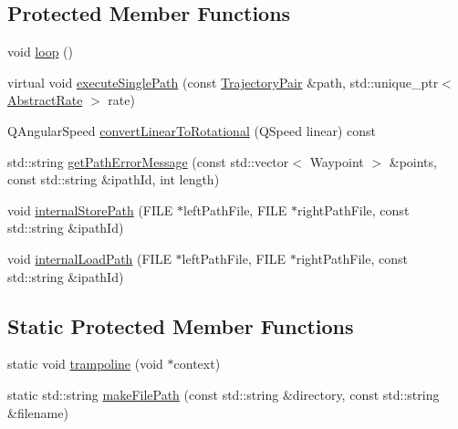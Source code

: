 \subsection*{Protected Member Functions}
\begin{DoxyCompactItemize}
\item 
void \mbox{\hyperlink{classokapi_1_1AsyncMotionProfileController_a8a41524c4cc3352e2eda15dfe3e7ad27}{loop}} ()
\item 
virtual void \mbox{\hyperlink{classokapi_1_1AsyncMotionProfileController_abbc724e5856bff8879cb834bfc3cc6c3}{execute\+Single\+Path}} (const \mbox{\hyperlink{structokapi_1_1AsyncMotionProfileController_1_1TrajectoryPair}{Trajectory\+Pair}} \&path, std\+::unique\+\_\+ptr$<$ \mbox{\hyperlink{classokapi_1_1AbstractRate}{Abstract\+Rate}} $>$ rate)
\item 
Q\+Angular\+Speed \mbox{\hyperlink{classokapi_1_1AsyncMotionProfileController_a74b2981453d36e01c30b66c522bdcb52}{convert\+Linear\+To\+Rotational}} (Q\+Speed linear) const
\item 
std\+::string \mbox{\hyperlink{classokapi_1_1AsyncMotionProfileController_add71d15d34ef8c10205c3b6791e32f71}{get\+Path\+Error\+Message}} (const std\+::vector$<$ Waypoint $>$ \&points, const std\+::string \&ipath\+Id, int length)
\item 
void \mbox{\hyperlink{classokapi_1_1AsyncMotionProfileController_ae9f67978e53a0bab9c96ef774505bd58}{internal\+Store\+Path}} (F\+I\+LE $\ast$left\+Path\+File, F\+I\+LE $\ast$right\+Path\+File, const std\+::string \&ipath\+Id)
\item 
void \mbox{\hyperlink{classokapi_1_1AsyncMotionProfileController_adc93d9516b749dee19f0af735d4b83cb}{internal\+Load\+Path}} (F\+I\+LE $\ast$left\+Path\+File, F\+I\+LE $\ast$right\+Path\+File, const std\+::string \&ipath\+Id)
\end{DoxyCompactItemize}
\subsection*{Static Protected Member Functions}
\begin{DoxyCompactItemize}
\item 
static void \mbox{\hyperlink{classokapi_1_1AsyncMotionProfileController_a969ac205f73c668edba002011c410efe}{trampoline}} (void $\ast$context)
\item 
static std\+::string \mbox{\hyperlink{classokapi_1_1AsyncMotionProfileController_a3380054b3feb2679fe5b919095959826}{make\+File\+Path}} (const std\+::string \&directory, const std\+::string \&filename)
\end{DoxyCompactItemize}
